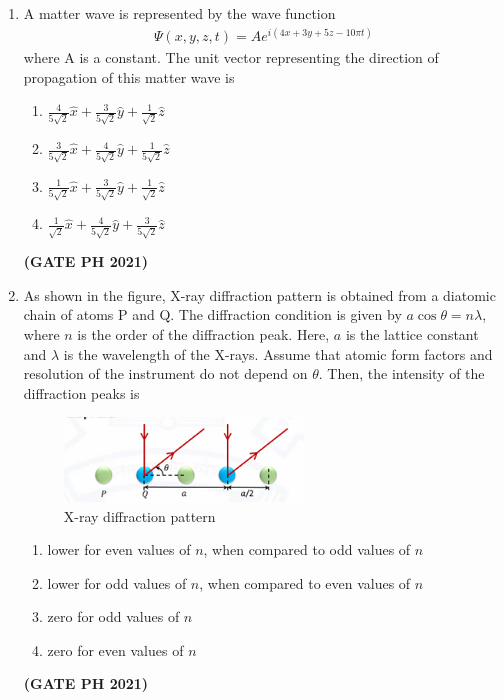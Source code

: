 \documentclass[14pt, a4paper]{extarticle}
\begin{document}
\begin{enumerate}[label=\textbf{Q.\arabic*}]
\begin{enumerate}[label=\textbf{Q.\arabic*}]
\item A matter wave is represented by the wave function
\begin{align*}
 \Psi(x, y, z, t) = A e^{i(4x+3y+5z-10\pi t)} 
 \end{align*}
where A is a constant. The unit vector representing the direction of propagation of this matter wave is
\begin{enumerate}
\item $\frac{4}{5\sqrt{2}}\hat{x} + \frac{3}{5\sqrt{2}}\hat{y} + \frac{1}{\sqrt{2}}\hat{z}$
\item $\frac{3}{5\sqrt{2}}\hat{x} + \frac{4}{5\sqrt{2}}\hat{y} + \frac{1}{5\sqrt{2}}\hat{z}$
\item $\frac{1}{5\sqrt{2}}\hat{x} + \frac{3}{5\sqrt{2}}\hat{y} + \frac{1}{\sqrt{2}}\hat{z}$
\item $\frac{1}{\sqrt{2}}\hat{x} + \frac{4}{5\sqrt{2}}\hat{y} + \frac{3}{5\sqrt{2}}\hat{z}$
\end{enumerate}
\hfill \textbf{(GATE PH 2021)}

\item As shown in the figure, X-ray diffraction pattern is obtained from a diatomic chain of atoms P and Q. The diffraction condition is given by $a \cos \theta = n\lambda$, where $n$ is the order of the diffraction peak. Here, $a$ is the lattice constant and $\lambda$ is the wavelength of the X-rays. Assume that atomic form factors and resolution of the instrument do not depend on $\theta$. Then, the intensity of the diffraction peaks is
\begin{figure}[H]
\centering
\includegraphics[width=0.6\textwidth]{figs/q13fig21.png}
\caption{X-ray diffraction pattern}
\end{figure}
\begin{enumerate}
\item lower for even values of $n$, when compared to odd values of $n$
\item lower for odd values of $n$, when compared to even values of $n$
\item zero for odd values of $n$
\item zero for even values of $n$
\end{enumerate}
\hfill \textbf{(GATE PH 2021)}


\end{enumerate}
\end{enumerate}
\end{document}

